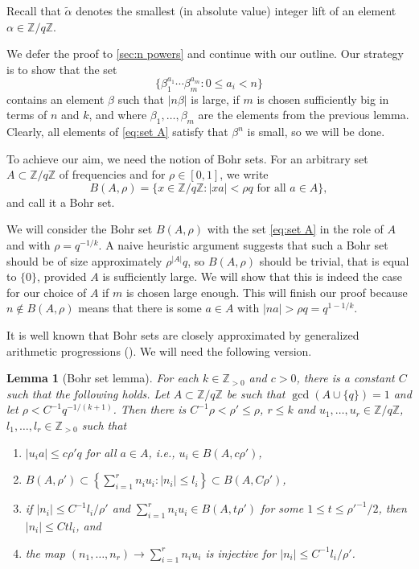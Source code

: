 \documentclass[12pt, a4paper]{amsart}
\numberwithin{equation}{section}
\newtheorem{lemma}[theorem]{Lemma}
\theoremstyle{definition}
\newcommand{\Z}{\mathbb{Z}}
\newcommand{\wt}{\widetilde}
\begin{document}
Recall that $\wt\alpha$ denotes the smallest (in absolute value)
integer lift of an element $\alpha\in\Z/q\Z$.

We defer the proof to \cref{sec:n powers} and continue with our outline.
Our strategy is to show that the set
\begin{equation}\label{eq:set A}
\{\beta_1^{a_1}\cdots\beta_m^{a_m}: 0\le a_i<n\}
\end{equation}
contains an element $\beta$ such that $|n\beta|$ is large, if $m$ is chosen sufficiently big in terms of $n$ and $k$,
and where $\beta_1,\ldots,\beta_m$ are the elements from the previous lemma.
Clearly, all elements of \eqref{eq:set A} satisfy that $\beta^n$ is small, so we will be done.

To achieve our aim, we need the notion of Bohr sets.
For an arbitrary set $A\subset\Z/q\Z$ of frequencies and for $\rho\in[0,1]$,
we write
\[
B(A,\rho)=\{x\in\Z/q\Z: |xa|<\rho q\text{ for all $a\in A$}\},
\] 
and call it a Bohr set.

We will consider the Bohr set $B(A,\rho)$ with the set \eqref{eq:set A} in the role
of $A$ and with $\rho= q^{-1/k}$.
A naive heuristic argument suggests that such a Bohr set should be of size
approximately $\rho^{|A|}q$, so $B(A,\rho)$ should be trivial, that is equal to
$\{0\}$, provided $A$
is sufficiently large.
We will show that this is indeed the case for our choice of $A$ if $m$
is chosen large enough.
This will finish our proof because $n\notin B(A,\rho)$ means that there is some
$a\in A$ with $|na|>\rho q= q^{1-1/k}$.

It is well known that Bohr sets are closely approximated by generalized arithmetic progressions (\cite[\S~4.22]{tao2006additive}). 
We will need the following version.

\begin{lemma}[Bohr set lemma]
\label{lem:Bohr Set Lemma}
For each $k\in\Z_{>0}$ and $c>0$, there is a constant $C$ such that 
the following holds.
Let $A\subset\Z/q\Z$ be such that $\gcd(A\cup\{q\})=1$
and let $\rho<C^{-1}q^{-1/(k+1)}$.
Then there is $C^{-1}\rho<\rho'\le\rho$,
$r\le k$ and $u_{1},\ldots,u_{r}\in\Z/q\Z$, $l_{1},\ldots,l_{r}\in\Z_{>0}$
such that
\begin{enumerate}
\item $|u_{i}a|\le c\rho'q$ for all $a\in A$, i.e., $u_{i}\in B(A,c\rho')$,
\item $B(A,\rho')\subset\left\{ \sum_{i=1}^{r}n_{i}u_{i}:|n_{i}|\le l_{i}\right\} \subset B(A,C\rho')$,
\item if $\left|n_{i}\right|\le C^{-1}l_{i}/\rho'$ and $\sum_{i=1}^{r}n_{i}u_{i}\in B(A,t\rho')$
for some $1\le t\le{\rho'}^{-1}/2$, then $\left|n_{i}\right|\le Ctl_{i}$, and
\item the map $(n_{1},\ldots,n_{r})\to\sum_{i=1}^{r}n_{i}u_{i}$ is injective
for $\left|n_{i}\right|\le C^{-1}l_{i}/\rho'$.
\end{enumerate}
\end{lemma}
\end{document}
